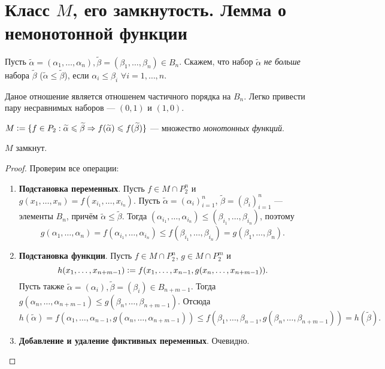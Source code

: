 \section{Класс $M$, его замкнутость. Лемма о немонотонной функции}

\begin{definition}
    Пусть $\widetilde{\alpha} = (\alpha_1, \ldots, \alpha_n), \widetilde{\beta} = (\beta_1, \ldots, \beta_n) \in B_n$. Скажем, что набор $\widetilde{\alpha}$ \textit{не больше} набора $\widetilde{\beta}$ ($\widetilde{\alpha} \leqslant \widetilde{\beta}$), если $\alpha_i \leqslant \beta_i$ $\forall i = 1, \ldots, n$.
\end{definition}

\begin{remark}
    Даное отношение является отношенем частичного порядка на $B_n$. Легко привести пару несравнимых наборов --- $(0, 1)$ и $(1, 0)$.
\end{remark}

\begin{definition}
    $M \vcentcolon = \{f \in P_2 : \widetilde{\alpha} \leqslant \widetilde{\beta} \Rightarrow f(\widetilde{\alpha}) \leqslant f(\widetilde{\beta})\}$ --- множество \textit{монотонных функций}.
\end{definition}

\begin{proposal}
    $M$ замкнут.
\end{proposal}

\begin{proof}
    Проверим все операции:
    \begin{enumerate}
        \item \textbf{Подстановка переменных}. Пусть $f \in M \cap P_2^n$ и $g(x_1, \ldots, x_n) = f(x_{i_1}, \ldots, x_{i_n})$. Пусть $\widetilde{\alpha} = (\alpha_i)_{i = 1}^n$, $\widetilde{\beta} = (\beta_i)_{i = 1}^n$ --- элементы $B_n$, причём $\widetilde{\alpha} \leqslant \widetilde{\beta}$. Тогда $(\alpha_{i_1}, \ldots, \alpha_{i_n}) \leqslant (\beta_{i_1}, \ldots, \beta_{i_n})$, поэтому
            \[
                g(\alpha_1, \ldots, \alpha_n) = f(\alpha_{i_1}, \ldots, \alpha_{i_n}) \leqslant f(\beta_{i_1}, \ldots, \beta_{i_n}) = g(\beta_1, \ldots, \beta_n).
            \]
        \item \textbf{Подстановка функции}. Пусть $f \in M \cap P_2^n$, $g \in M \cap P_2^m$ и
            \[
                h(x_1, \ldots, x_{n + m - 1}) \vcentcolon = f(x_1, \ldots, x_{n - 1}, g(x_n, \ldots, x_{n + m - 1})).
            \]
            Пусть также $\widetilde{\alpha} = (\alpha_i), \widetilde{\beta} = (\beta_i) \in B_{n + m - 1}$. Тогда $g(\alpha_n, \ldots, \alpha_{n + m - 1}) \leqslant g(\beta_n, \ldots, \beta_{n + m - 1})$. Отсюда
            \[
                h(\widetilde{\alpha}) = f(\alpha_1, \ldots, \alpha_{n - 1}, g(\alpha_n, \ldots, \alpha_{n + m - 1})) \leqslant f(\beta_1, \ldots, \beta_{n - 1}, g(\beta_n, \ldots, \beta_{n + m - 1})) = h(\widetilde{\beta}).
            \]
        \item \textbf{Добавление и удаление фиктивных переменных}. Очевидно.
    \end{enumerate}
\end{proof}


